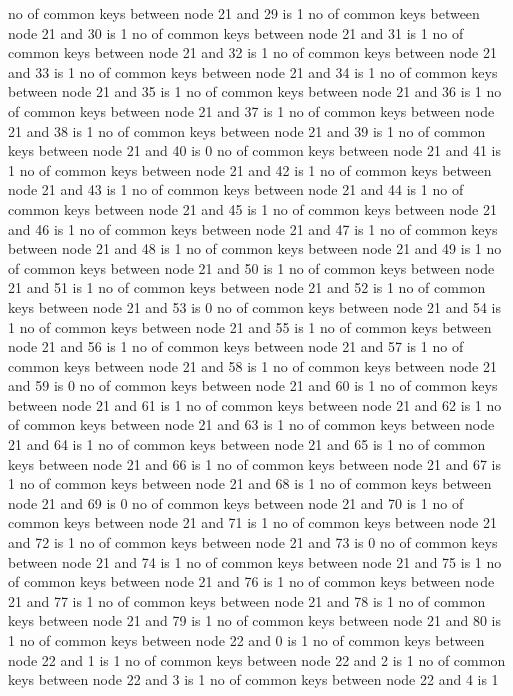 no of common keys between node 21 and 29 is 1
no of common keys between node 21 and 30 is 1
no of common keys between node 21 and 31 is 1
no of common keys between node 21 and 32 is 1
no of common keys between node 21 and 33 is 1
no of common keys between node 21 and 34 is 1
no of common keys between node 21 and 35 is 1
no of common keys between node 21 and 36 is 1
no of common keys between node 21 and 37 is 1
no of common keys between node 21 and 38 is 1
no of common keys between node 21 and 39 is 1
no of common keys between node 21 and 40 is 0
no of common keys between node 21 and 41 is 1
no of common keys between node 21 and 42 is 1
no of common keys between node 21 and 43 is 1
no of common keys between node 21 and 44 is 1
no of common keys between node 21 and 45 is 1
no of common keys between node 21 and 46 is 1
no of common keys between node 21 and 47 is 1
no of common keys between node 21 and 48 is 1
no of common keys between node 21 and 49 is 1
no of common keys between node 21 and 50 is 1
no of common keys between node 21 and 51 is 1
no of common keys between node 21 and 52 is 1
no of common keys between node 21 and 53 is 0
no of common keys between node 21 and 54 is 1
no of common keys between node 21 and 55 is 1
no of common keys between node 21 and 56 is 1
no of common keys between node 21 and 57 is 1
no of common keys between node 21 and 58 is 1
no of common keys between node 21 and 59 is 0
no of common keys between node 21 and 60 is 1
no of common keys between node 21 and 61 is 1
no of common keys between node 21 and 62 is 1
no of common keys between node 21 and 63 is 1
no of common keys between node 21 and 64 is 1
no of common keys between node 21 and 65 is 1
no of common keys between node 21 and 66 is 1
no of common keys between node 21 and 67 is 1
no of common keys between node 21 and 68 is 1
no of common keys between node 21 and 69 is 0
no of common keys between node 21 and 70 is 1
no of common keys between node 21 and 71 is 1
no of common keys between node 21 and 72 is 1
no of common keys between node 21 and 73 is 0
no of common keys between node 21 and 74 is 1
no of common keys between node 21 and 75 is 1
no of common keys between node 21 and 76 is 1
no of common keys between node 21 and 77 is 1
no of common keys between node 21 and 78 is 1
no of common keys between node 21 and 79 is 1
no of common keys between node 21 and 80 is 1
no of common keys between node 22 and 0 is 1
no of common keys between node 22 and 1 is 1
no of common keys between node 22 and 2 is 1
no of common keys between node 22 and 3 is 1
no of common keys between node 22 and 4 is 1
